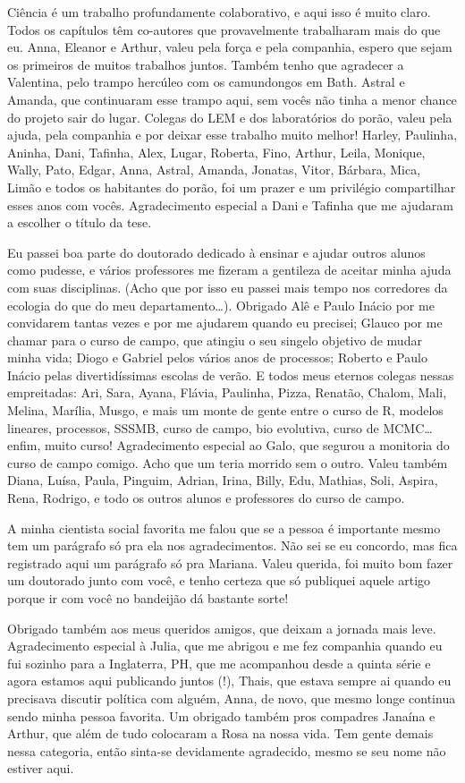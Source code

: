 Ciência é um trabalho profundamente colaborativo, e aqui isso é muito claro. Todos os capítulos têm co-autores que provavelmente trabalharam mais do que eu. Anna, Eleanor e Arthur, valeu pela força e pela companhia, espero que sejam os primeiros de muitos trabalhos juntos. Também tenho que agradecer a Valentina, pelo trampo hercúleo com os camundongos em Bath. Astral e Amanda, que continuaram esse trampo aqui, sem vocês não tinha a menor chance do projeto sair do lugar. Colegas do LEM e dos laboratórios do porão, valeu pela ajuda, pela companhia e por deixar esse trabalho muito melhor! Harley, Paulinha, Aninha, Dani, Tafinha, Alex, Lugar, Roberta, Fino,
Arthur, Leila, Monique, Wally, Pato, Edgar, Anna, Astral, Amanda, Jonatas, Vitor, Bárbara, Mica, Limão e todos os habitantes do porão, foi um prazer e um privilégio compartilhar esses anos com vocês. Agradecimento especial a Dani e Tafinha que me ajudaram a escolher o título da tese.

Eu passei boa parte do doutorado dedicado à ensinar e ajudar outros alunos como pudesse, e vários professores me fizeram a gentileza de aceitar minha ajuda com suas disciplinas. (Acho que por isso eu passei mais tempo nos corredores da ecologia do que do meu departamento…). Obrigado Alê e Paulo Inácio por me convidarem tantas vezes e por me ajudarem quando eu precisei; Glauco por me chamar para o curso de campo, que atingiu o seu singelo objetivo de mudar minha vida; Diogo e Gabriel pelos vários anos de processos; Roberto e Paulo Inácio pelas divertidíssimas escolas de verão. E todos meus eternos colegas nessas empreitadas: Ari, Sara, Ayana, Flávia, Paulinha, Pizza, Renatão, Chalom, Mali, Melina, Marília, Musgo, e mais um monte de gente entre o curso de R, modelos lineares, processos, SSSMB, curso de campo, bio evolutiva, curso de MCMC… enfim, muito curso! Agradecimento especial ao Galo, que segurou a monitoria do curso de campo comigo. Acho que um teria morrido sem o outro. Valeu também Diana, Luísa, Paula, Pinguim, Adrian, Irina, Billy, Edu, Mathias, Soli, Aspira, Rena, Rodrigo, e todo os outros alunos e professores do curso de campo.

A minha cientista social favorita me falou que se a pessoa é importante mesmo tem um parágrafo só pra ela nos agradecimentos. Não sei se eu concordo, mas fica registrado aqui um parágrafo só pra Mariana. Valeu querida, foi muito bom fazer um doutorado junto com você, e tenho certeza que só publiquei aquele artigo porque ir com você no bandeijão dá bastante sorte!

Obrigado também aos meus queridos amigos, que deixam a jornada mais leve. Agradecimento especial à Julia, que me abrigou e me fez companhia quando eu fui sozinho para a Inglaterra, PH, que me acompanhou desde a quinta série e agora estamos aqui publicando juntos (!), Thais, que estava sempre ai quando eu precisava discutir política com alguém, Anna, de novo, que mesmo longe continua sendo minha pessoa favorita. Um obrigado também pros compadres Janaína e Arthur, que além de tudo colocaram a Rosa na nossa vida. Tem gente demais nessa categoria, então sinta-se devidamente agradecido, mesmo se seu nome não estiver aqui. 

